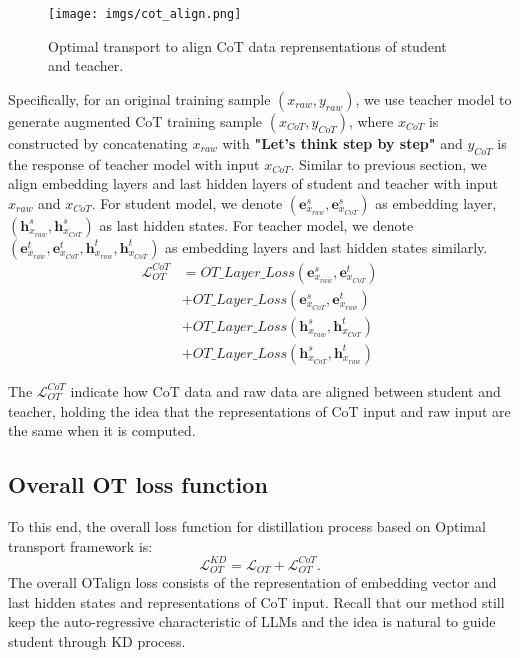 \begin{figure}[t]
    \centering
    \texttt{[image: imgs/cot\_align.png]}
    \caption{Optimal transport to align CoT data reprensentations of student and teacher.}
    \label{fig:cot_align}
\end{figure}

Specifically, for an original training sample $(x_{raw},y_{raw})$, we use teacher model to generate augmented CoT training sample $(x_{CoT},y_{CoT})$, where $x_{CoT}$ is constructed by concatenating $x_{raw}$ with \textbf{"Let's think step by step"} and $y_{CoT}$ is the response of teacher model with input $x_{CoT}$. 
Similar to previous section, we align embedding layers and last hidden layers of student and teacher with input $x_{raw}$ and $x_{CoT}$. For student model, we denote $(\mathbf{e}_{x_{raw}}^{s}, \mathbf{e}_{x_{CoT}}^{s})$ as embedding layer, $(\mathbf{h}_{x_{raw}}^{s}, \mathbf{h}_{x_{CoT}}^{s})$ as last hidden states. For teacher model, we denote $(\mathbf{e}_{x_{raw}}^{t}, \mathbf{e}_{x_{CoT}}^{t}, \mathbf{h}_{x_{raw}}^{t}, \mathbf{h}_{x_{CoT}}^{t})$ as embedding layers and last hidden states similarly.
\begin{equation}
\begin{aligned}
\mathcal{L}_{OT}^{CoT} &= OT\_Layer\_Loss(\mathbf{e}_{x_{raw}}^{s},\mathbf{e}_{x_{CoT}}^{t})  \\
& +OT\_Layer\_Loss(\mathbf{e}_{x_{CoT}}^{s},\mathbf{e}_{x_{raw}}^{t}) \\
& +OT\_Layer\_Loss(\mathbf{h}_{x_{raw}}^{s},\mathbf{h}_{x_{CoT}}^{t})  \\
& +OT\_Layer\_Loss(\mathbf{h}_{x_{CoT}}^{s},\mathbf{h}_{x_{raw}}^{t})
\end{aligned}
\label{loss:ot_cot}
\end{equation}

The $\mathcal{L}_{OT}^{CoT}$ indicate how CoT data and raw data are aligned between student and teacher, holding the idea that the representations of CoT input and raw input are the same when it is computed. 

\subsection{Overall OT loss function}
To this end, the overall loss function for distillation process based on Optimal transport framework is:
\begin{equation}
    \mathcal{L}_{OT}^{KD} = \mathcal{L}_{OT} + \mathcal{L}_{OT}^{CoT}.
\end{equation}
The overall OTalign loss consists of the representation of embedding vector and last hidden states and representations of CoT input. Recall that our method still keep the auto-regressive characteristic of LLMs and the idea is natural to guide student through KD process.


